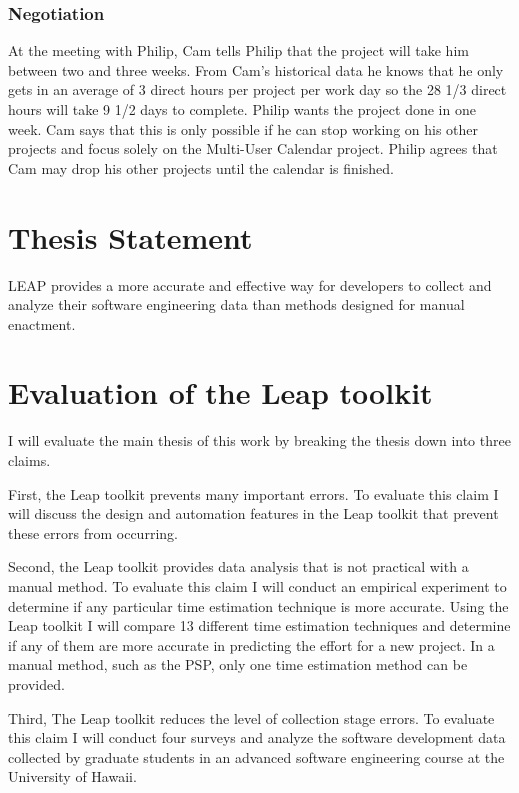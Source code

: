 \subsubsection*{Negotiation}
At the meeting with Philip, Cam tells Philip that the project will take him
between two and three weeks.  From Cam's historical data he knows that he only
gets in an average of 3 direct hours per project per work day so the 28 1/3
direct hours will take 9 1/2 days to complete. Philip wants the project done in 
one week.  Cam says that this is only possible if he can stop working on his
other projects and focus solely on the Multi-User Calendar project.  Philip
agrees that Cam may drop his other projects until the calendar is finished.


\section{Thesis Statement}

LEAP provides a more accurate and effective way for developers to collect and
analyze their software engineering data than methods designed for manual
enactment. 

\section{Evaluation of the Leap toolkit}

I will evaluate the main thesis of this work by breaking the thesis down into
three claims. 

First, the Leap toolkit prevents many important errors. To evaluate this claim
I will discuss the design and automation features in the Leap toolkit that 
prevent these errors from occurring. 

Second, the Leap toolkit provides data analysis that is not practical with a
manual method. To evaluate this claim I will conduct an empirical experiment to 
determine if any particular time estimation technique is more accurate. Using
the Leap toolkit I will compare 13 different time estimation techniques and
determine if any of them are more accurate in predicting the effort for a new
project. In a manual method, such as the PSP, only one time estimation method
can be provided.

Third, The Leap toolkit reduces the level of collection stage errors. To
evaluate this claim I will conduct four surveys and analyze the software
development data collected by graduate students in an advanced software
engineering course at the University of Hawaii.

